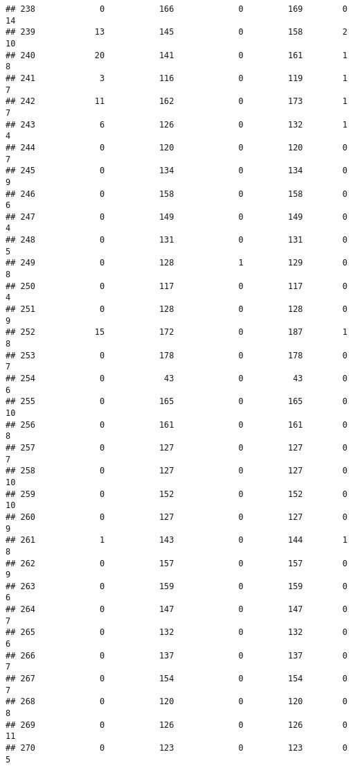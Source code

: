 \documentclass[]{article}
\begin{document}
\begin{verbatim}
## 238             0           166             0         169        0       14
## 239            13           145             0         158        2       10
## 240            20           141             0         161        1        8
## 241             3           116             0         119        1        7
## 242            11           162             0         173        1        7
## 243             6           126             0         132        1        4
## 244             0           120             0         120        0        7
## 245             0           134             0         134        0        9
## 246             0           158             0         158        0        6
## 247             0           149             0         149        0        4
## 248             0           131             0         131        0        5
## 249             0           128             1         129        0        8
## 250             0           117             0         117        0        4
## 251             0           128             0         128        0        9
## 252            15           172             0         187        1        8
## 253             0           178             0         178        0        7
## 254             0            43             0          43        0        6
## 255             0           165             0         165        0       10
## 256             0           161             0         161        0        8
## 257             0           127             0         127        0        7
## 258             0           127             0         127        0       10
## 259             0           152             0         152        0       10
## 260             0           127             0         127        0        9
## 261             1           143             0         144        1        8
## 262             0           157             0         157        0        9
## 263             0           159             0         159        0        6
## 264             0           147             0         147        0        7
## 265             0           132             0         132        0        6
## 266             0           137             0         137        0        7
## 267             0           154             0         154        0        7
## 268             0           120             0         120        0        8
## 269             0           126             0         126        0       11
## 270             0           123             0         123        0        5

\end{verbatim}
\end{document}
